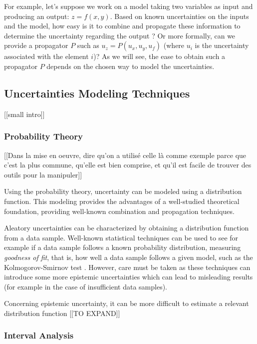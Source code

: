 For example, let's suppose we work on a model taking two variables as input and producing an output: $z=f(x,y)$.
Based on known uncertainties on the inputs and the model, how easy is it to combine and propagate these information to determine the uncertainty regarding the output ? Or more formally, can we provide a propagator $P$ such as $u_z = P(u_x, u_y, u_f)$ (where $u_i$ is the uncertainty associated with the element $i$)? As we will see, the ease to obtain such a propagator $P$ depends on the chosen way to model the uncertainties.

\subsection{Uncertainties Modeling Techniques}

[[small intro]]

\subsubsection{Probability Theory}

[[Dans la mise en oeuvre, dire qu'on a utilisé celle là comme exemple parce que c'est la plus commune, qu'elle est bien comprise, et qu'il est facile de trouver des outils pour la manipuler]]

Using the probability theory, uncertainty can be modeled using a distribution function. This modeling provides the advantages of a well-studied theoretical foundation, providing well-known combination and propagation techniques.

Aleatory uncertainties can be characterized by obtaining a distribution function from a data sample.
Well-known statistical techniques can be used to see for example if a data sample follows a known probability distribution, measuring \emph{goodness of fit}, that is, how well a data sample follows a given model, such as the Kolmogorov-Smirnov test \cite{Massey_1951}. 
However, care must be taken as these techniques can introduce some more epistemic uncertainties which can lead to misleading results (for example in the case of insufficient data samples).

Concerning epistemic uncertainty, it can be more difficult to estimate a relevant distribution function  [[TO EXPAND]]

\subsubsection{Interval Analysis}


